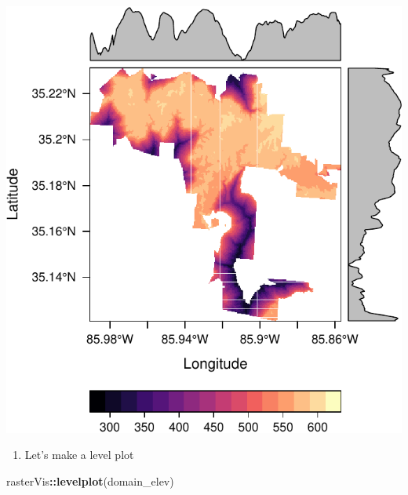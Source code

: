 \documentclass[
]{book}
\newenvironment{Shaded}{\begin{snugshade}}{\end{snugshade}}
\newcommand{\KeywordTok}[1]{\textcolor[rgb]{0.13,0.29,0.53}{\textbf{#1}}}
\newcommand{\NormalTok}[1]{#1}
\newcommand{\OperatorTok}[1]{\textcolor[rgb]{0.81,0.36,0.00}{\textbf{#1}}}
\providecommand{\tightlist}{%
  \setlength{\itemsep}{0pt}\setlength{\parskip}{0pt}}
\begin{document}
\includegraphics{figures/unnamed-chunk-436-1.pdf}

\begin{enumerate}
\def\labelenumi{\arabic{enumi}.}
\setcounter{enumi}{29}
\tightlist
\item
  Let's make a level plot
\end{enumerate}

\begin{Shaded}
\begin{Highlighting}[]
\NormalTok{rasterVis}\OperatorTok{::}\KeywordTok{levelplot}\NormalTok{(domain_elev)}
\end{Highlighting}
\end{Shaded}
\end{document}
